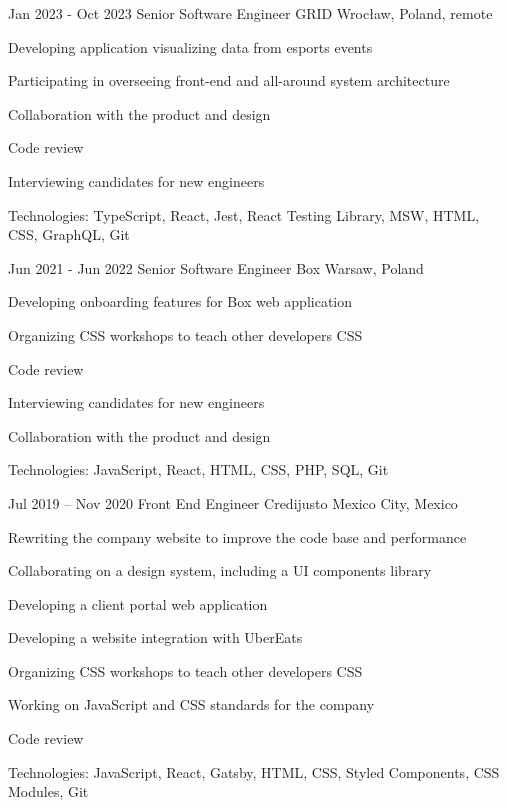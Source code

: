 \begin{sectionlist}
    \sectionlistitemjob
        {Jan 2023 - Oct 2023}
        {Senior Software Engineer}
        {GRID}
        {Wrocław, Poland, remote}
        {
            \begin{joblisting}
                \item Developing application visualizing data from esports events
                \item Participating in overseeing front-end and all-around system architecture
                \item Collaboration with the product and design
                \item Code review
                \item Interviewing candidates for new engineers
                \item Technologies: TypeScript, React, Jest, React Testing Library, MSW, HTML, CSS, GraphQL, Git
            \end{joblisting}
        }

    \sectionlistitemjob
        {Jun 2021 - Jun 2022}
        {Senior Software Engineer}
        {Box}
        {Warsaw, Poland}
        {
            \begin{joblisting}
                \item Developing onboarding features for Box web application
                \item Organizing CSS workshops to teach other developers CSS
                \item Code review
                \item Interviewing candidates for new engineers
                \item Collaboration with the product and design
                \item Technologies: JavaScript, React, HTML, CSS, PHP, SQL, Git
            \end{joblisting}
        }

    \sectionlistitemjob
        {Jul 2019 -- Nov 2020}
        {Front End Engineer}
        {Credijusto}
        {Mexico City, Mexico}
        {
            \begin{joblisting}
                \item Rewriting the company website to improve the code base and
                    performance
                \item Collaborating on a design system, including a UI components library
                \item Developing a client portal web application
                \item Developing a website integration with UberEats
                \item Organizing CSS workshops to teach other developers CSS
                \item Working on JavaScript and CSS standards for the company
                \item Code review
                \item Technologies: JavaScript, React, Gatsby, HTML, CSS,
                    Styled Components, CSS Modules, Git
            \end{joblisting}
        }


\end{sectionlist}
